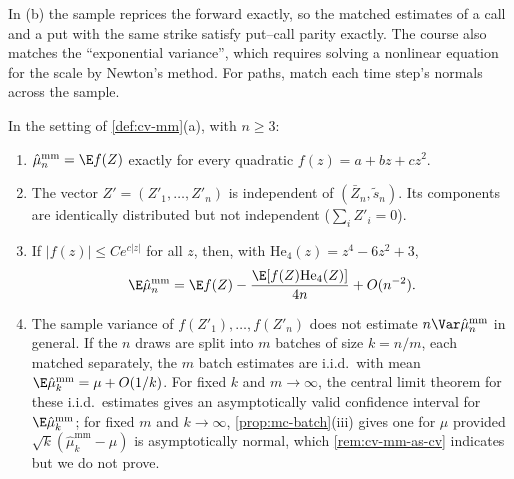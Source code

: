 In (b) the sample reprices the forward exactly, so the matched estimates of a call and a
put with the same strike satisfy put--call parity exactly. The course also matches the
``exponential variance'', which requires solving a nonlinear equation for the scale by
Newton's method. For paths, match each time step's normals across the sample.

\begin{proposition}\label{prop:cv-moment-matching}
In the setting of \cref{def:cv-mm}(a), with $n\ge3$:
\begin{enumerate}[label=(\roman*)]
  \item $\hat\mu^{\mathrm{mm}}_n=\E f(Z)$ exactly for every quadratic $f(z)=a+bz+cz^2$.
  \item The vector $Z'=(Z'_1,\dots,Z'_n)$ is independent of $(\bar Z_n,\tilde s_n)$. Its
    components are identically distributed but not independent ($\sum_iZ'_i=0$).
  \item If $|f(z)|\le Ce^{c|z|}$ for all $z$, then, with $\mathrm{He}_4(z)=z^4-6z^2+3$,
    \[
      \E\hat\mu^{\mathrm{mm}}_n=\E f(Z)-\frac{\E[f(Z)\mathrm{He}_4(Z)]}{4n}+O(n^{-2}) .
    \]
  \item The sample variance of $f(Z'_1),\dots,f(Z'_n)$ does not estimate
    $n\Var\hat\mu^{\mathrm{mm}}_n$ in general. If the $n$ draws are split into $m$ batches of
    size $k=n/m$, each matched separately, the $m$ batch estimates are i.i.d.\ with mean
    $\E\hat\mu^{\mathrm{mm}}_k=\mu+O(1/k)$. For fixed $k$ and $m\to\infty$, the central limit
    theorem for these i.i.d.\ estimates gives an asymptotically valid confidence interval for
    $\E\hat\mu^{\mathrm{mm}}_k$; for fixed $m$ and $k\to\infty$, \cref{prop:mc-batch}(iii)
    gives one for $\mu$ provided $\sqrt k(\hat\mu^{\mathrm{mm}}_k-\mu)$ is asymptotically
    normal, which \cref{rem:cv-mm-as-cv} indicates but we do not prove.
\end{enumerate}
\end{proposition}

